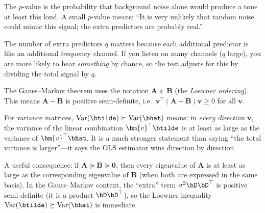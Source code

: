 The $p$-value is the probability that background noise alone would
produce a tone at least this loud.
A small $p$-value means: ``It is very unlikely that random noise
could mimic this signal; the extra predictors are probably real.''

The number of extra predictors $q$ matters because each additional
predictor is like an additional frequency channel.
If you listen on many channels ($q$ large), you are more likely to hear
\emph{something} by chance, so the test adjusts for this by dividing
the total signal by $q$.




\medskip
\begin{remark}
The Gauss--Markov theorem uses the notation
$\bm{A} \succeq \bm{B}$ (the \emph{Loewner ordering}).
This means $\bm{A} - \bm{B}$ is positive semi-definite, i.e.\
$\bm{v}^\top(\bm{A} - \bm{B})\bm{v} \ge 0$ for all $\bm{v}$.

For variance matrices, $\text{Var}(\btilde) \succeq \text{Var}(\bhat)$
means: in \emph{every direction} $\bm{v}$, the variance of the linear
combination $\bm{v}^\top\btilde$ is at least as large as the variance of
$\bm{v}^\top\bhat$.
It is a much stronger statement than saying ``the total variance is
larger''---it says the OLS estimator wins direction by direction.

A useful consequence: if $\bm{A} \succeq \bm{B} \succeq \bm{0}$, then
every eigenvalue of $\bm{A}$ is at least as large as the corresponding
eigenvalue of $\bm{B}$ (when both are expressed in the same basis).
In the Gauss--Markov context, the ``extra'' term $\sigma^2\bD\bD^\top$
is positive semi-definite (it is a product $\bD\bD^\top$), so the
Loewner inequality $\text{Var}(\btilde) \succeq \text{Var}(\bhat)$ is
immediate.
\end{remark}



